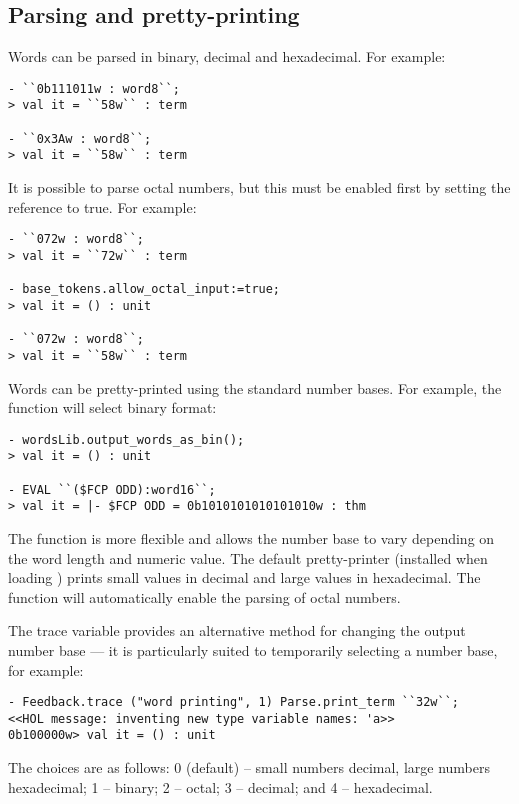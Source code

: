 \subsection{Parsing and pretty-printing}

Words can be parsed in binary, decimal and hexadecimal.   For example:
\begin{session}
\begin{verbatim}
- ``0b111011w : word8``;
> val it = ``58w`` : term

- ``0x3Aw : word8``;
> val it = ``58w`` : term
\end{verbatim}
\end{session}
It is possible to parse octal numbers, but this must be enabled first by setting the reference  to true.  For example:
\begin{session}
\begin{verbatim}
- ``072w : word8``;
> val it = ``72w`` : term

- base_tokens.allow_octal_input:=true;
> val it = () : unit

- ``072w : word8``;
> val it = ``58w`` : term
\end{verbatim}
\end{session}

Words can be pretty-printed using the standard number bases. For example, the function
 will select binary format:
\begin{session}
\begin{verbatim}
- wordsLib.output_words_as_bin();
> val it = () : unit

- EVAL ``($FCP ODD):word16``;
> val it = |- $FCP ODD = 0b1010101010101010w : thm
\end{verbatim}
\end{session}
The function  is more flexible and allows the number base to vary depending on
the word length and numeric value.  The default pretty-printer (installed when loading ) prints small values in decimal and large values in hexadecimal.
The function  will automatically enable the parsing of octal numbers.

The trace variable  provides an alternative method for changing the output number base --- it is particularly suited to temporarily selecting a number base, for example:
\begin{session}
\begin{verbatim}
- Feedback.trace ("word printing", 1) Parse.print_term ``32w``;
<<HOL message: inventing new type variable names: 'a>>
0b100000w> val it = () : unit
\end{verbatim}
\end{session}
The choices are as follows: 0 (default) -- small numbers decimal, large numbers hexadecimal; 1 -- binary; 2 -- octal; 3 -- decimal; and 4 -- hexadecimal.

